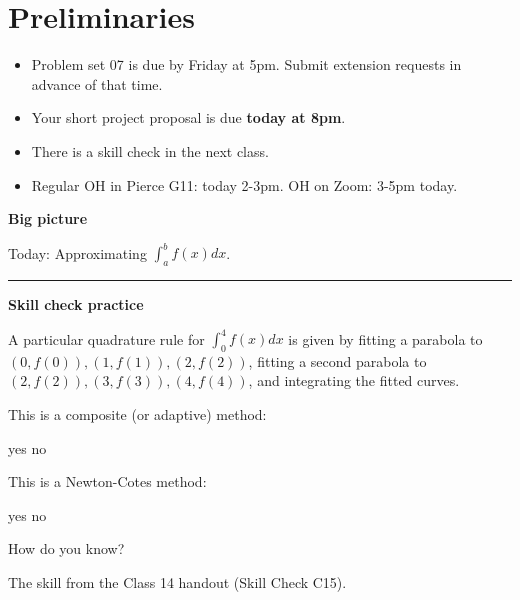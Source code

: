 \documentclass[12pt,letterpaper,noanswers]{exam}
\begin{document}
 \pdfpageheight 11in 
  \pdfpagewidth 8.5in

\noindent 

\section*{Preliminaries}

\begin{itemize}
\itemsep0pt
\item Problem set 07 is due by Friday at 5pm.  Submit extension requests in advance of that time.
\item Your short project proposal is due \textbf{today at 8pm}.
\item There is a skill check in the next class.
\item Regular OH in Pierce G11: today 2-3pm.  OH on Zoom: 3-5pm today.
\end{itemize}


\noindent\textbf{Big picture}

Today: Approximating $\int_{a}^{b}f(x)dx$.

\vspace{0.2cm}
\hrule
\vspace{0.2cm}

\noindent \textbf{Skill check practice}
\begin{questions}
\item %


A particular quadrature rule for $\displaystyle\int_0^4f(x)dx$ is given by fitting a parabola to $(0,f(0)), (1,f(1)), (2,f(2))$, fitting a second parabola to $(2,f(2)), (3,f(3)), (4,f(4))$, and integrating the fitted curves.

This is a composite (or adaptive) method:
\begin{oneparchoices}
\choice yes \choice no
\end{oneparchoices}

This is a Newton-Cotes method:
\begin{oneparchoices}
\choice yes \choice no
\end{oneparchoices}

How do you know?

\item The skill from the Class 14 handout (Skill Check C15).
\end{questions}
\end{document}
